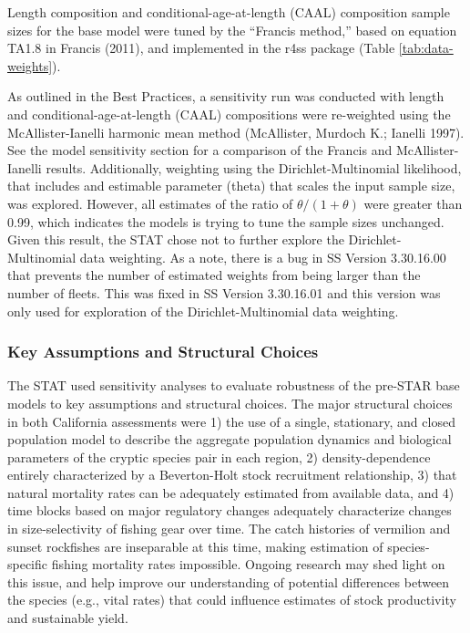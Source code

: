 \documentclass[11pt,
  english,
]{article}
\begin{document}
Length composition and conditional-age-at-length (CAAL) composition sample sizes for the base model were tuned by the ``Francis method,'' based on equation TA1.8 in Francis {(2011)\leavevmode\tagmcend\tagstructend}, and implemented in the r4ss package (Table \ref{tab:data-weights}).

As outlined in the Best Practices, a sensitivity run was conducted with length and conditional-age-at-length (CAAL) compositions were re-weighted using the McAllister-Ianelli harmonic mean method {(McAllister, Murdoch K.; Ianelli 1997)\leavevmode\tagmcend\tagstructend}. See the model sensitivity section for a comparison of the Francis and McAllister-Ianelli results. Additionally, weighting using the Dirichlet-Multinomial likelihood, that includes and estimable parameter (theta) that scales the input sample size, was explored. However, all estimates of the ratio of {\(\theta/(1+\theta)\)\leavevmode\tagmcend\tagstructend} were greater than 0.99, which indicates the models is trying to tune the sample sizes unchanged. Given this result, the STAT chose not to further explore the Dirichlet-Multinomial data weighting. As a note, there is a bug in SS Version 3.30.16.00 that prevents the number of estimated weights from being larger than the number of fleets. This was fixed in SS Version 3.30.16.01 and this version was only used for exploration of the Dirichlet-Multinomial data weighting.


\hypertarget{key-assumptions-and-structural-choices}{%
\subsubsection{Key Assumptions and Structural Choices}\label{key-assumptions-and-structural-choices}}

\leavevmode\tagmcend\tagstructend

The STAT used sensitivity analyses to evaluate robustness of the pre-STAR base models to key assumptions and structural choices. The major structural choices in both California assessments were 1) the use of a single, stationary, and closed population model to describe the aggregate population dynamics and biological parameters of the cryptic species pair in each region, 2) density-dependence entirely characterized by a Beverton-Holt stock recruitment relationship, 3) that natural mortality rates can be adequately estimated from available data, and 4) time blocks based on major regulatory changes adequately characterize changes in size-selectivity of fishing gear over time. The catch histories of vermilion and sunset rockfishes are inseparable at this time, making estimation of species-specific fishing mortality rates impossible. Ongoing research may shed light on this issue, and help improve our understanding of potential differences between the species (e.g., vital rates) that could influence estimates of stock productivity and sustainable yield.
\end{document}
